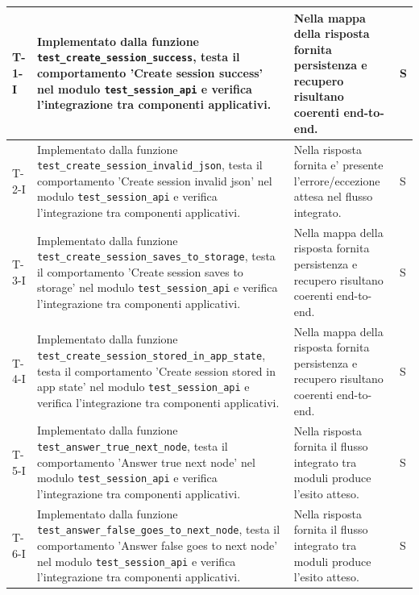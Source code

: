 \documentclass[a4paper,12pt]{article}
\begin{document}
{{\begin{longtable}{|>{\RaggedRight\arraybackslash}p{1.55cm}|>{\RaggedRight\arraybackslash}p{8.0cm}|>{\RaggedRight\arraybackslash}p{4.6cm}|>{\RaggedRight\arraybackslash}p{1.2cm}|}
        \hline
        \endlastfoot
        T-1-I & Implementato dalla funzione \texttt{test\_\allowbreak create\_\allowbreak session\_\allowbreak success}, testa il comportamento 'Create session success' nel modulo \texttt{test\_\allowbreak session\_\allowbreak api} e verifica l'integrazione tra componenti applicativi. & Nella mappa della risposta fornita persistenza e recupero risultano coerenti end-to-end. & S \\
        \hline
        T-2-I & Implementato dalla funzione \texttt{test\_\allowbreak create\_\allowbreak session\_\allowbreak invalid\_\allowbreak json}, testa il comportamento 'Create session invalid json' nel modulo \texttt{test\_\allowbreak session\_\allowbreak api} e verifica l'integrazione tra componenti applicativi. & Nella risposta fornita e' presente l'errore/eccezione attesa nel flusso integrato. & S \\
        \hline
        T-3-I & Implementato dalla funzione \texttt{test\_\allowbreak create\_\allowbreak session\_\allowbreak saves\_\allowbreak to\_\allowbreak storage}, testa il comportamento 'Create session saves to storage' nel modulo \texttt{test\_\allowbreak session\_\allowbreak api} e verifica l'integrazione tra componenti applicativi. & Nella mappa della risposta fornita persistenza e recupero risultano coerenti end-to-end. & S \\
        \hline
        T-4-I & Implementato dalla funzione \texttt{test\_\allowbreak create\_\allowbreak session\_\allowbreak stored\_\allowbreak in\_\allowbreak app\_\allowbreak state}, testa il comportamento 'Create session stored in app state' nel modulo \texttt{test\_\allowbreak session\_\allowbreak api} e verifica l'integrazione tra componenti applicativi. & Nella mappa della risposta fornita persistenza e recupero risultano coerenti end-to-end. & S \\
        \hline
        T-5-I & Implementato dalla funzione \texttt{test\_\allowbreak answer\_\allowbreak true\_\allowbreak next\_\allowbreak node}, testa il comportamento 'Answer true next node' nel modulo \texttt{test\_\allowbreak session\_\allowbreak api} e verifica l'integrazione tra componenti applicativi. & Nella risposta fornita il flusso integrato tra moduli produce l'esito atteso. & S \\
        \hline
        T-6-I & Implementato dalla funzione \texttt{test\_\allowbreak answer\_\allowbreak false\_\allowbreak goes\_\allowbreak to\_\allowbreak next\_\allowbreak node}, testa il comportamento 'Answer false goes to next node' nel modulo \texttt{test\_\allowbreak session\_\allowbreak api} e verifica l'integrazione tra componenti applicativi. & Nella risposta fornita il flusso integrato tra moduli produce l'esito atteso. & S \\

\end{longtable}}}
\end{document}
